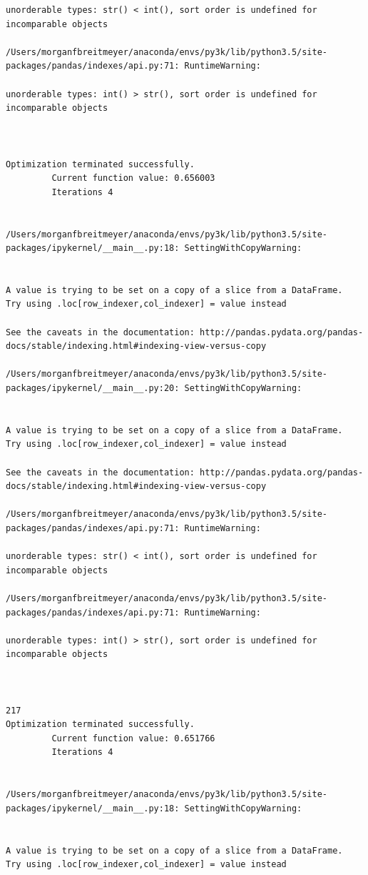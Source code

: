 \begin{lstlisting}
unorderable types: str() < int(), sort order is undefined for incomparable objects

/Users/morganfbreitmeyer/anaconda/envs/py3k/lib/python3.5/site-packages/pandas/indexes/api.py:71: RuntimeWarning:

unorderable types: int() > str(), sort order is undefined for incomparable objects



Optimization terminated successfully.
         Current function value: 0.656003
         Iterations 4


/Users/morganfbreitmeyer/anaconda/envs/py3k/lib/python3.5/site-packages/ipykernel/__main__.py:18: SettingWithCopyWarning:


A value is trying to be set on a copy of a slice from a DataFrame.
Try using .loc[row_indexer,col_indexer] = value instead

See the caveats in the documentation: http://pandas.pydata.org/pandas-docs/stable/indexing.html#indexing-view-versus-copy

/Users/morganfbreitmeyer/anaconda/envs/py3k/lib/python3.5/site-packages/ipykernel/__main__.py:20: SettingWithCopyWarning:


A value is trying to be set on a copy of a slice from a DataFrame.
Try using .loc[row_indexer,col_indexer] = value instead

See the caveats in the documentation: http://pandas.pydata.org/pandas-docs/stable/indexing.html#indexing-view-versus-copy

/Users/morganfbreitmeyer/anaconda/envs/py3k/lib/python3.5/site-packages/pandas/indexes/api.py:71: RuntimeWarning:

unorderable types: str() < int(), sort order is undefined for incomparable objects

/Users/morganfbreitmeyer/anaconda/envs/py3k/lib/python3.5/site-packages/pandas/indexes/api.py:71: RuntimeWarning:

unorderable types: int() > str(), sort order is undefined for incomparable objects



217
Optimization terminated successfully.
         Current function value: 0.651766
         Iterations 4


/Users/morganfbreitmeyer/anaconda/envs/py3k/lib/python3.5/site-packages/ipykernel/__main__.py:18: SettingWithCopyWarning:


A value is trying to be set on a copy of a slice from a DataFrame.
Try using .loc[row_indexer,col_indexer] = value instead


\end{lstlisting}
